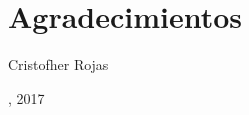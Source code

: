 \section*{Agradecimientos}


\begin{flushright}
	Cristofher Rojas
\end{flushright}
\begin{flushright}
	, 2017
\end{flushright}
